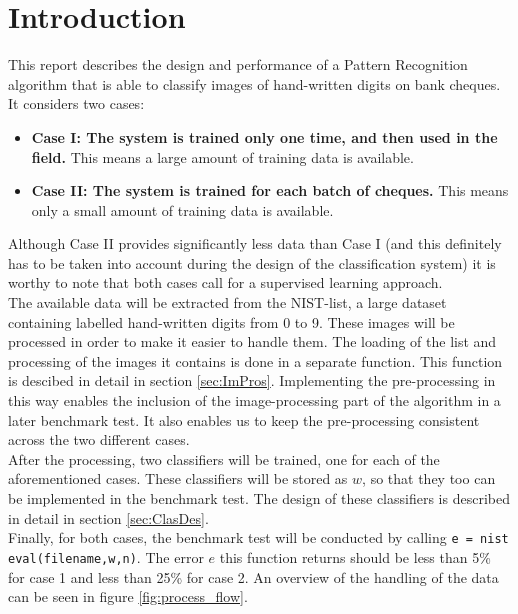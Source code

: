  \section{Introduction}
  \label{Intro}
  This report describes the design and performance of a Pattern Recognition algorithm that is able to classify images of hand-written digits on bank cheques. It considers two cases:
  \begin{itemize}
  	\item \textbf{Case I: The system is trained only one time, and then used in the field.} This means a large amount of training data is available.
  	\item \textbf{Case II: The system is trained for each batch of cheques.} This means only a small amount of training data is available.
  \end{itemize}
Although Case II provides significantly less data than Case I (and this definitely has to be taken into account during the design of the classification system) it is worthy to note that both cases call for a supervised learning approach. \\
The available data will be extracted from the NIST-list, a large dataset containing labelled hand-written digits from 0 to 9. These images will be processed in order to make it easier to handle them. The loading of the list and processing of the images it contains is done in a separate function.  This function is descibed in detail in section \ref{sec:ImPros}. Implementing the pre-processing in this way enables the inclusion of the image-processing part of the algorithm in a later benchmark test. It also enables us to keep the pre-processing consistent across the two different cases.\\
\indent After the processing, two classifiers will be trained, one for each of the aforementioned cases. These classifiers will be stored as $w$, so that they too can be implemented in the benchmark test. The design of these classifiers is described in detail in section \ref{sec:ClasDes}. \\
\indent Finally, for both cases, the benchmark test will be conducted by calling \texttt{e = nist eval(filename,w,n)}. The error $e$ this function returns should be less than 5\% for case 1 and less than 25\% for case 2. An overview of the handling of the data can be seen in figure \ref{fig:process_flow}.
